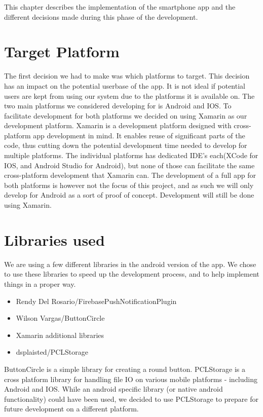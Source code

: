This chapter describes the implementation of the smartphone app and the different decisions made during this phase of the development. 

\section{Target Platform}
The first decision we had to make was which platforms to target. This decision has an impact on the potential userbase of the app. It is not ideal if potential users are kept from using our system due to the platforms it is available on.
The two main platforms we considered developing for is Android and IOS. To facilitate development for both platforms we decided on using Xamarin \cite{xamarin} as our development platform. 
Xamarin is a development platform designed with cross-platform app development in mind. 
It enables reuse of significant parts of the code, thus cutting down the potential development time needed to develop for multiple platforms. 
The individual platforms has dedicated IDE’s each(XCode\cite{xcode} for IOS, and Android Studio for Android), but none of those can facilitate the same cross-platform development that Xamarin can. 
The development of a full app for both platforms is however not the focus of this project, and as such we will only develop for Android as a sort of proof of concept. Development will still be done using Xamarin.

\section{Libraries used}
We are using a few different libraries in the android version of the app. We chose to use these libraries to speed up the development process, and to help implement things in a proper way.
\begin{itemize}
    \item Rendy Del Rosario/FirebasePushNotificationPlugin
    \item Wilson Vargas/ButtonCircle
    \item Xamarin additional libraries
    \item dsplaisted/PCLStorage
\end{itemize}

ButtonCircle is a simple library for creating a round button.
PCLStorage is a cross platform library for handling file IO on various mobile platforms - including Android and IOS. While an android specific library (or native android functionality) could have been used, we decided to use PCLStorage to prepare for future development on a different platform.

